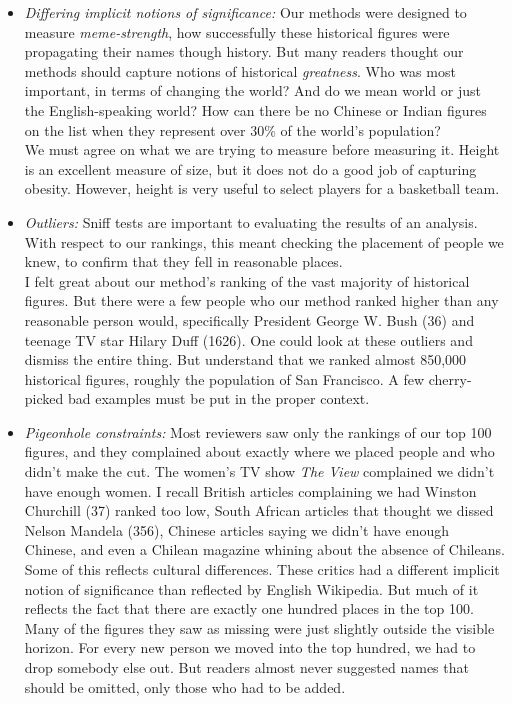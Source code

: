 \documentclass[10pt]{article}
\begin{document}
\begin{itemize}
  \item \textit{Differing implicit notions of significance:} Our methods were designed to measure \textit{meme-strength}, how successfully these historical figures were propagating their names though history. But many readers thought our methods should capture notions of historical \textit{greatness}. Who was most important, in terms of changing the world? And do we mean world or just the English-speaking world? How can there be no Chinese or Indian figures on the list when they represent over $30 \%$ of the world's population?\\
We must agree on what we are trying to measure before measuring it. Height is an excellent measure of size, but it does not do a good job of capturing obesity. However, height is very useful to select players for a basketball team.
  \item \textit{Outliers:} Sniff tests are important to evaluating the results of an analysis. With respect to our rankings, this meant checking the placement of people we knew, to confirm that they fell in reasonable places.\\
I felt great about our method's ranking of the vast majority of historical figures. But there were a few people who our method ranked higher than any reasonable person would, specifically President George W. Bush (36) and teenage TV star Hilary Duff (1626). One could look at these outliers and dismiss the entire thing. But understand that we ranked almost 850,000 historical figures, roughly the population of San Francisco. A few cherry-picked bad examples must be put in the proper context.
  \item \textit{Pigeonhole constraints:} Most reviewers saw only the rankings of our top 100 figures, and they complained about exactly where we placed people and who didn't make the cut. The women's TV show \textit{The View} complained we didn't have enough women. I recall British articles complaining we had Winston Churchill (37) ranked too low, South African articles that thought we dissed Nelson Mandela (356), Chinese articles saying we didn't have enough Chinese, and even a Chilean magazine whining about the absence of Chileans.\\
Some of this reflects cultural differences. These critics had a different implicit notion of significance than reflected by English Wikipedia. But much of it reflects the fact that there are exactly one hundred places in the top 100. Many of the figures they saw as missing were just slightly outside the visible horizon. For every new person we moved into the top hundred, we had to drop somebody else out. But readers almost never suggested names that should be omitted, only those who had to be added.
\end{itemize}
\end{document}
